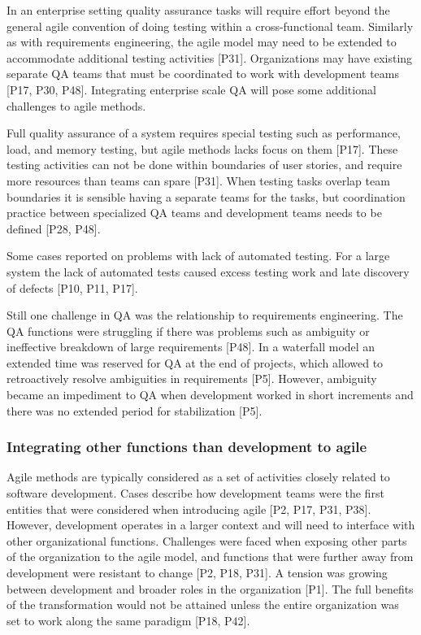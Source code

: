 \documentclass[preprint,authoryear,12pt]{elsarticle}
\begin{document}
In an enterprise setting quality assurance tasks will require effort beyond the
general agile convention of doing testing within a cross-functional team.
Similarly as with requirements engineering, the agile model may need to be
extended to accommodate additional testing activities [P31]. Organizations may
have existing separate QA teams that must be coordinated to work with
development teams [P17, P30, P48]. Integrating enterprise scale QA will pose
some additional challenges to agile methods.

Full quality assurance of a system requires special testing such as performance,
load, and memory testing, but agile methods lacks focus on them [P17]. These
testing activities can not be done within boundaries of user stories, and
require more resources than teams can spare [P31]. When testing tasks overlap
team boundaries it is sensible having a separate teams for the tasks, but
coordination practice between specialized QA teams and development teams needs
to be defined [P28, P48].

Some cases reported on problems with lack of automated testing. For a large
system the lack of automated tests caused excess testing work and late discovery
of defects [P10, P11, P17].

Still one challenge in QA was the relationship to requirements engineering. The
QA functions were struggling if there was problems such as ambiguity or
ineffective breakdown of large requirements [P48]. In a waterfall model an
extended time was reserved for QA at the end of projects, which allowed to
retroactively resolve ambiguities in requirements [P5]. However, ambiguity
became an impediment to QA when development worked in short increments and
there was no extended period for stabilization [P5].


\subsubsection{Integrating other functions than development to agile}

Agile methods are typically considered as a set of activities closely related to
software development. Cases describe how development teams were the first
entities that were considered when introducing agile [P2, P17, P31, P38].
However, development operates in a larger context and will need to interface
with other organizational functions.
Challenges were faced when exposing other parts of the organization to the agile
model, and functions that were further away from development were resistant to
change [P2, P18, P31]. A tension was growing between development and broader
roles in the organization [P1]. The full benefits of the transformation would
not be attained unless the entire organization was set to work along the same
paradigm [P18, P42].
\end{document}
